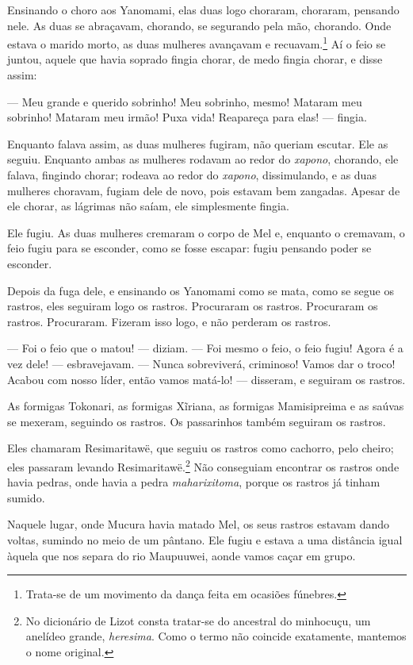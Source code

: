 Ensinando o choro aos Yanomami, elas duas logo choraram, choraram,
pensando nele. As duas se abraçavam, chorando, se segurando pela mão,
chorando. Onde estava o marido morto, as duas mulheres avançavam e
recuavam.\footnote{Trata-se de um movimento da dança feita em ocasiões fúnebres.} Aí o feio se juntou, aquele que havia
soprado fingia chorar, de medo fingia chorar, e disse assim: 

--- Meu grande e querido sobrinho! Meu sobrinho, mesmo! Mataram meu
sobrinho! Mataram meu irmão! Puxa vida! Reapareça para elas! ---
fingia. 

Enquanto falava assim, as duas mulheres fugiram, não queriam escutar.
Ele as seguiu. Enquanto ambas as mulheres rodavam ao redor do \textit{xapono},
chorando, ele falava, fingindo chorar; rodeava ao redor do
\textit{xapono}, dissimulando, e as duas mulheres choravam, fugiam dele de novo,
pois estavam bem zangadas. Apesar de ele chorar, as lágrimas não saíam,
ele simplesmente fingia. 

Ele fugiu. As duas mulheres cremaram o corpo de Mel e, enquanto o
cremavam, o feio fugiu para se esconder, como se fosse escapar: fugiu
pensando poder se esconder. 

Depois da fuga dele, e ensinando os Yanomami como se mata, como se segue os
rastros, eles seguiram logo os rastros. Procuraram os rastros.
Procuraram os rastros. Procuraram. Fizeram isso logo, e não perderam os
rastros. 

--- Foi o feio que o matou! --- diziam. --- Foi mesmo o feio, o feio
fugiu! Agora é a vez dele! --- esbravejavam. --- Nunca sobreviverá,
criminoso! Vamos dar o troco! Acabou com nosso líder, então vamos
matá-lo! --- disseram, e seguiram os rastros. 

As formigas Tokonari, as formigas Xĩriana, as
formigas Mamisipreima e as saúvas se mexeram, seguindo os
rastros. Os passarinhos também seguiram os rastros. 

Eles chamaram {Resimaritawë}, que seguiu os rastros como cachorro,
pelo cheiro; eles passaram levando Resimaritawë.\footnote{No dicionário de Lizot consta tratar-se do ancestral do minhocuçu, um anelídeo grande, \textit{heresima}. Como o termo não coincide exatamente, mantemos o nome original.} Não conseguiam encontrar os rastros onde havia pedras, onde havia a
pedra \textit{maharixitoma}, porque os rastros já tinham sumido. 

Naquele lugar, onde Mucura havia matado Mel, os seus rastros estavam
dando voltas, sumindo no meio de um pântano. Ele fugiu e estava a uma
distância igual àquela que nos separa do rio Maupuuwei, aonde
vamos {caçar em grupo}. 

